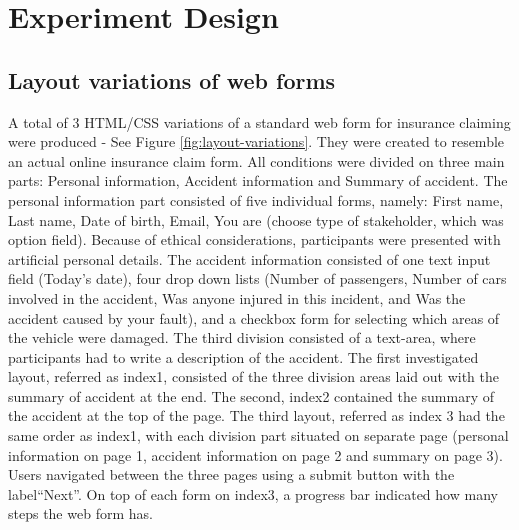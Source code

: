 \documentclass[../main/Feedback.tex]{subfiles}
\begin{document}
\section{Experiment Design}

\subsection{Layout variations of web forms}
A total of 3 HTML/CSS variations of a standard web form for insurance claiming were produced - See Figure \ref{fig:layout-variations}.
They were created to resemble an actual online insurance claim form.
All conditions were divided on three main parts: Personal information, Accident information and Summary of accident.
The personal information part consisted of five individual forms, namely: First name, Last name, Date of birth, Email, You are (choose type of stakeholder, which was option field).
Because of ethical considerations, participants were presented with artificial personal details.
The accident information consisted of one text input field (Today's date), four drop down lists (Number of passengers, Number of cars involved in the accident, Was anyone injured in this incident, and Was the accident caused by your fault), and a checkbox form for selecting which areas of the vehicle were damaged.
The third division consisted of a text-area, where participants had to write a description of the accident.
The first investigated layout, referred as index1, consisted of the three division areas laid out with the summary of accident at the end.
The second, index2 contained the summary of the accident at the top of the page.
The third layout, referred as index 3 had the same order as index1, with each division part situated on separate page (personal information on page 1, accident information on page 2 and summary on page 3).
Users navigated between the three pages using a submit button with the label``Next''.
On top of each form on index3, a progress bar indicated how many steps the web form has.
\end{document}

